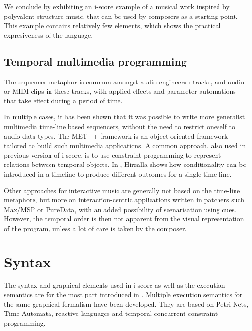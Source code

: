 \documentclass{article}
\begin{document}
We conclude by exhibiting an i-score example of a musical work inspired by polyvalent structure music,
that can be used by composers as a starting point. 
This example contains relatively few elements, which shows the practical expresiveness of the language.

\subsection{Temporal multimedia programming}
The sequencer metaphor is common amongst audio engineers : 
tracks, and audio or MIDI clips in these tracks, with applied effects 
and parameter automations that take effect during a period of time.

In multiple cases, it has been shown that it was possible to write 
more generalist multimedia time-line based sequencers, without the need to restrict oneself 
to audio data types. 
The MET++ framework\cite{ackermann1994direct} is an object-oriented framework 
tailored to build such multimedia applications.
A common approach, also used in previous version of i-score, is to use constraint programming 
to represent relations between temporal objects\cite{song1999interactive, allombert2006concurrent, toro2010concurrent}. 
In \cite{hirzalla1995temporal}, Hirzalla shows how conditionality can be introduced in a timeline 
to produce different outcomes for a single time-line.

Other approaches for interactive music are generally not based on the time-line metaphore, 
but more on interaction-centric applications written in patchers such Max/MSP or PureData, 
with an added possibility of scenarisation using cues. 
However, the temporal order is then not apparent from the visual representation of the program, 
unless a lot of care is taken by the composer.

\section{Syntax}
The syntax and graphical elements used in i-score as well as the 
execution semantics are for the most part introduced in \cite{celerier2015ossia, baltazar2014score}.
Multiple execution semantics for the same graphical formalism have been developed. 
They are based on Petri Nets\cite{allombert2007system}, Time Automata\cite{arias2015exploiting}, reactive languages\cite{arias2014executing} and temporal concurrent constraint programming\cite{toro2010model}.
\end{document}
